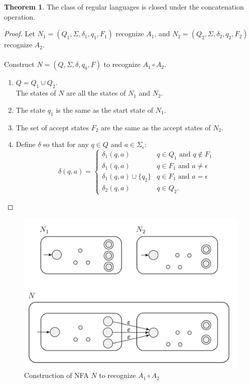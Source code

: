 \documentclass[11pt]{article}
\theoremstyle{definition}
\newtheorem{thm}{Theorem}[section]
\begin{document}
\begin{thm}
The class of regular languages is closed under the concatenation operation.
\end{thm}
\begin{proof}
Let $N_1 = (Q_1, \Sigma, \delta_1, q_1, F_1)$ recognize $A_1$, and $N_2= (Q_2, \Sigma, \delta_2, q_2, F_2)$ recognize $A_2$.\\\\
Construct $N = (Q, \Sigma, \delta, q_0, F)$ to recognize $A_1\circ A_2$.
\begin{enumerate}
    \item $Q = Q_1 \cup Q_2$.\\
    The states of $N$ are all the states of $N_1$ and $N_2$.
    \item The state $q_1$ is the same as the start state of $N_1$.
    \item The set of accept states $F_2$ are the same as the accept states of $N_2$.
    \item Define $\delta$ so that for any $q\in Q$ and $a\in \Sigma_\epsilon$:
    \begin{equation*}
        \delta(q,a) = \begin{cases}
           \delta_1(q,a)               & q\in Q_1 \text{ and } q\notin F_1\\
           \delta_1(q,a)               & q\in F_1 \text{ and } a\neq\epsilon\\
           \delta_1(q,a)\cup\{q_2\}    & q\in F_1 \text{ and } a=\epsilon\\
           \delta_2(q,a)               & q\in Q_2.
       \end{cases}
    \end{equation*}
    \end{enumerate}   
\end{proof}
\begin{figure}[h]
	\centering
	\includegraphics[width=0.5\linewidth]{nfa_concat.png}
	\caption{Construction of NFA $N$ to recognize $A_1\circ A_2$}
	\label{fig}
\end{figure}
\end{document}

